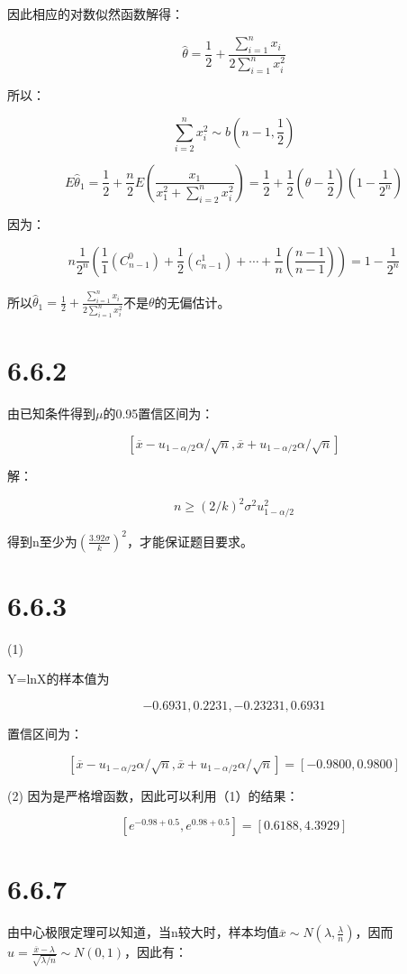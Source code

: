 \documentclass{article}
\begin{document}
因此相应的对数似然函数解得：

$$\hat \theta = \frac12+\frac{\sum_{i=1}^n x_i}{2\sum^n_{i=1}x_i^2}$$

所以：

$$\sum^n_{i=2}x_i^2\sim b(n-1,\frac12)$$

$$E\hat \theta_1=\frac12+\frac n2E(\frac{x_1}{x_1^2+\sum_{i=2}^n x_i^2})=\frac12+\frac12(\theta-\frac12)(1-\frac1{2^n})$$

因为：

$$n\frac1{2^n}(\frac11(C^0_{n-1})+\frac12(c^1_{n-1})+\cdots+\frac1n(\frac{n-1}{n-1}))=1-\frac1{2^n}$$

所以$\hat \theta_1=\frac12+\frac{\sum^n_{i=1}x_i}{2\sum^n_{i=1}x_i^2}$不是$\theta$的无偏估计。

\section{6.6.2}
由已知条件得到$\mu$的0.95置信区间为：

$$[\overline x - u_{1-\alpha/2}\alpha/\sqrt{n}, \overline x + u_{1-\alpha/2}\alpha/\sqrt{n}]$$

解：

$$n\geq (2/k)^2\sigma^2u^2_{1-\alpha/2}$$

得到n至少为$(\frac{3.92\sigma}{k})^2$，才能保证题目要求。



\section{6.6.3}
(1)

Y=lnX的样本值为

$$-0.6931,0.2231,-0.23231,0.6931$$

置信区间为：

$$[\overline x - u_{1-\alpha/2}\alpha/\sqrt{n}, \overline x + u_{1-\alpha/2}\alpha/\sqrt{n}]=[-0.9800,0.9800]$$

(2)
因为是严格增函数，因此可以利用（1）的结果：

$$[e^{-0.98+0.5},e^{0.98+0.5}]=[0.6188,4.3929]$$



\section{6.6.7}
由中心极限定理可以知道，当n较大时，样本均值$\overline x \sim N(\lambda,\frac\lambda n)$，因而$u=\frac{\overline x -\lambda}{\sqrt{\lambda/n}}\sim N(0,1)$，因此有：
\end{document}
